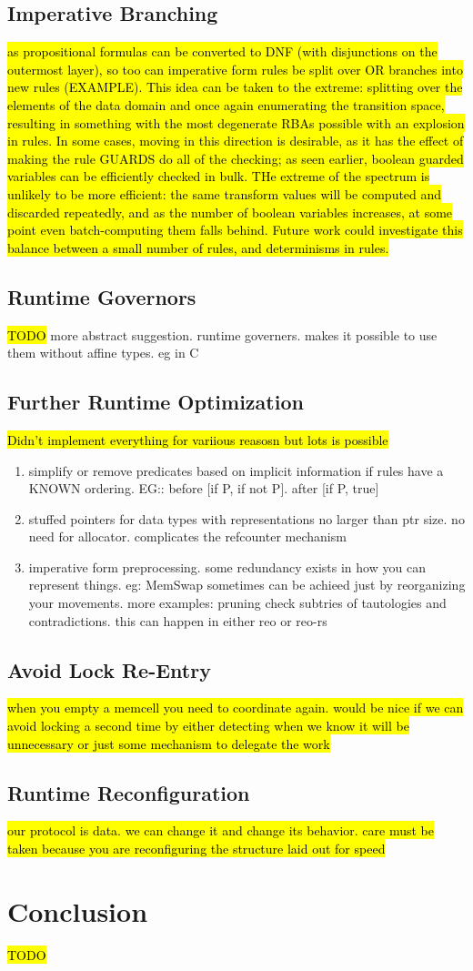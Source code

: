 \subsection{Imperative Branching}
\hl{as propositional formulas can be converted to DNF (with disjunctions on the outermost layer), so too can imperative form rules be split over OR branches into new rules (EXAMPLE). This idea can be taken to the extreme: splitting over the elements of the data domain and once again enumerating the transition space, resulting in something with the most degenerate RBAs possible with an explosion in rules. In some cases, moving in this direction is desirable, as it has the effect of making the rule GUARDS do all of the checking; as seen earlier, boolean guarded variables can be efficiently checked in bulk. THe extreme of the spectrum is unlikely to be more efficient: the same transform values will be computed and discarded repeatedly, and as the number of boolean variables increases, at some point even batch-computing them falls behind. Future work could investigate this balance between a small number of rules, and determinisms in rules.}
\subsection{Runtime Governors}
\hl{TODO}
more abstract suggestion. runtime governers. makes it possible to use them without affine types. eg in C

\subsection{Further Runtime Optimization}
\hl{Didn't implement everything for variious reasosn but lots is possible}
\begin{enumerate}
	\item simplify or remove predicates based on implicit information if rules have a KNOWN ordering. EG:: before [if P, if not P]. after [if P, true]
	\item stuffed pointers for data types with representations no larger than ptr size. no need for allocator. complicates the refcounter mechanism
	\item imperative form preprocessing. some redundancy exists in how you can represent things. eg: MemSwap sometimes can be achieed just by reorganizing your movements. more examples: pruning check subtries of tautologies and contradictions. this can happen in either reo or reo-rs
\end{enumerate}
\subsection{Avoid Lock Re-Entry}
\hl{when you empty a memcell you need to coordinate again. would be nice if we can avoid locking a second time by either detecting when we know it will be unnecessary or just some mechanism to delegate the work}
\subsection{Runtime Reconfiguration}
\hl{our protocol is data. we can change it and change its behavior. care must be taken because you are reconfiguring the structure laid out for speed}
\section{Conclusion}
\hl{TODO}